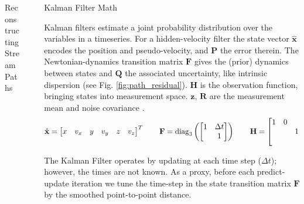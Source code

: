 \documentclass[final]{beamer}
\newlength{\sepwidth}
\newlength{\colwidth}
\newcommand{\separatorcolumn}{\begin{column}{\sepwidth}\end{column}}
\begin{document}
\begin{frame}[t]
\begin{columns}[t]
\begin{column}{\colwidth}
\begin{block}{Reconstructing Stream Paths}
    \end{block}

\end{column}

\separatorcolumn

\begin{column}{\colwidth}

    \begin{block}{Kalman Filter Math}

            Kalman filters estimate a joint probability distribution over the variables in a timeseries. For a hidden-velocity filter the state vector $\hat{\mathbf{x}}$ encodes the position and pseudo-velocity, and $\mathbf{P}$ the error therein. The Newtonian-dynamics transition matrix $\mathbf{F}$ gives the (prior) dynamics between states and $\mathbf{Q}$ the associated uncertainty, like intrinsic dispersion (see Fig. \ref{fig:path_residual}). $\mathbf{H}$ is the observation function, bringing states into measurement space. $\mathbf{z}$, $\mathbf{R}$ are the measurement mean and noise covariance \cite{KalmanFiltersinPythonby}.
            \begin{equation}
                \hat{\mathbf{x}} = \left[\begin{matrix}
                        x & v_x & y & v_y & z & v_z  \\
                    \end{matrix}\right]^{T}
                \qquad
                \mathbf{F} = \rm{diag}_3 \left(
                    \left[\begin{matrix}
                        1 & \Delta t  \\
                          & 1 \\
                    \end{matrix}\right]
                \right) 
                \qquad
                \mathbf{H} = \left[\begin{matrix}
                        1 & 0 &   &   &   &   \\
                          &   & 1 & 0 &   &   \\
                          &   &   &   & 1 & 0 \\
                    \end{matrix}\right]
            \end{equation}

            The Kalman Filter operates by updating at each time step ($\Delta t$); however, the times are not known. As a proxy, before each predict-update iteration we tune the time-step in the state transition matrix $\mathbf{F}$ by the smoothed point-to-point distance.


\end{block}
\end{column}
\end{columns}
\end{frame}
\end{document}
